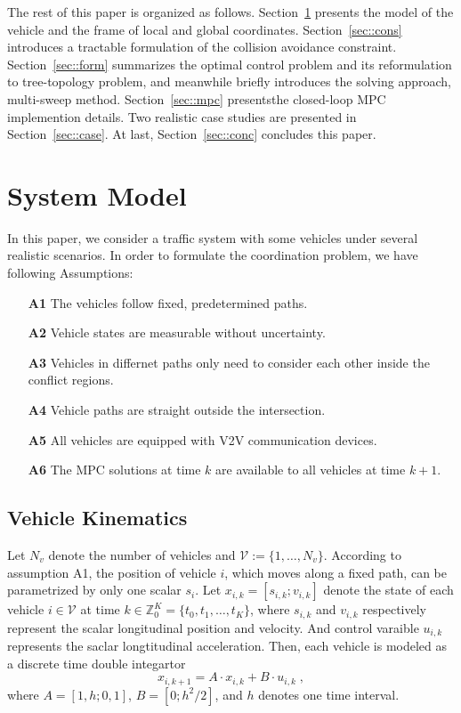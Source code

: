 \documentclass[letterpaper, 10 pt, conference]{ieeeconf}
\begin{document}
The rest of this paper is organized as follows. Section~\ref{sec::model} presents the model of the vehicle and the frame of local and global coordinates. Section~\ref{sec::cons} introduces a tractable formulation of the collision avoidance constraint. Section~\ref{sec::form} summarizes the optimal control problem and its reformulation to tree-topology problem, and meanwhile briefly introduces the solving approach, multi-sweep method. Section~\ref{sec::mpc} presentsthe closed-loop MPC implemention details. Two realistic case studies are presented in Section~\ref{sec::case}. At last, Section~\ref{sec::conc} concludes this paper.

\section{System Model}
\label{sec::model}
In this paper, we consider a traffic system with some vehicles under several realistic scenarios. In order to formulate the coordination problem, we have following Assumptions:
\begin{itemize}
	\item[\textbf{A1}] The vehicles follow fixed, predetermined paths.
	\item[\textbf{A2}] Vehicle states are measurable without uncertainty.
	\item[\textbf{A3}] Vehicles in differnet paths only need to consider each other inside the conflict regions.
	\item[\textbf{A4}] Vehicle paths are straight outside the intersection.
	\item[\textbf{A5}] All vehicles are equipped with V2V communication devices.
	\item[\textbf{A6}] The MPC solutions at time $k$ are available to all vehicles at time $k+1$.
\end{itemize}


\subsection{Vehicle Kinematics}
Let $N_v$ denote the number of vehicles and $\mathcal{V} := \{1,\dots,N_v\}$. According to assumption A1, the position of vehicle $i$, which moves along a fixed path, can be parametrized by only one scalar $s_i$. Let $x_{i,k} = [s_{i,k};v_{i,k}]$ denote the state of each vehicle $i\in \mathcal{V}$ at time $ k\in \mathbb{Z}_0^{K} = \lbrace t_0,t_1,\dots,t_K \rbrace$, where $s_{i,k}$ and $v_{i,k}$ respectively represent the scalar longitudinal position and velocity. And control varaible $u_{i,k}$ represents the saclar longtitudinal acceleration. Then, each vehicle is modeled as a discrete time double integartor
\begin{equation}
x_{i,k+1} = A\cdot x_{i,k} + B\cdot u_{i,k}\;,
\end{equation}
where $A=[1,h;0,1]$, $B=[0;h^2/2]$, and $h$ denotes one time interval.
\end{document}

